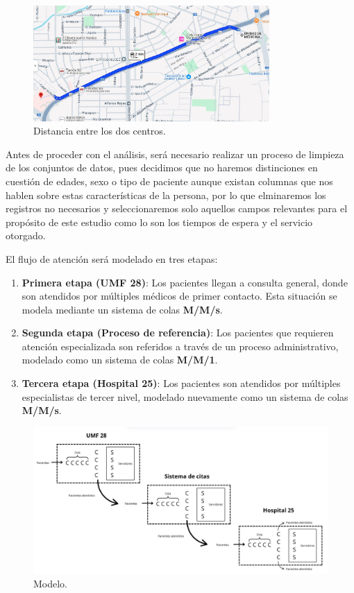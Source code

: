 \documentclass[10pt]{article}
\begin{document}
    \begin{figure}[h]
		\centering
		\includegraphics[width=90mm]{./images/mapa.jpg}
		\caption{Distancia entre los dos centros.}
	\end{figure}
	\FloatBarrier

    Antes de proceder con el análisis, será necesario realizar un proceso de limpieza de los conjuntos de datos, pues decidimos que no haremos distinciones en cuestión de edades, sexo o tipo de paciente aunque existan columnas que nos hablen sobre estas características de la persona, por lo que elminaremos los registros no necesarios y seleccionaremos solo aquellos campos relevantes para el propósito de este estudio como lo son los tiempos de espera y el servicio otorgado.
    
    El flujo de atención será modelado en tres etapas:

    \begin{enumerate}
        \item \textbf{Primera etapa (UMF 28)}: Los pacientes llegan a consulta general, donde son atendidos por múltiples médicos de primer contacto. Esta situación se modela mediante un sistema de colas \textbf{M/M/s}.
        
        \item \textbf{Segunda etapa (Proceso de referencia)}: Los pacientes que requieren atención especializada son referidos a través de un proceso administrativo, modelado como un sistema de colas \textbf{M/M/1}.
        
        \item \textbf{Tercera etapa (Hospital 25)}: Los pacientes son atendidos por múltiples especialistas de tercer nivel, modelado nuevamente como un sistema de colas \textbf{M/M/s}.
    \end{enumerate}

    \begin{figure}[h]
		\centering
		\includegraphics[width=130mm]{./images/sistema.jpg}
		\caption{Modelo.}
	\end{figure}
\end{document}
